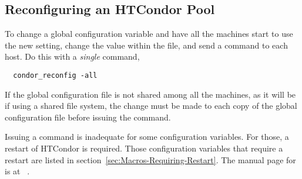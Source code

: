 \subsection{\label{sec:Reconfigure-Pool}Reconfiguring an HTCondor Pool}

To change a global configuration variable and have all the
machines start to use the new setting, change the value within the file,
and send a  command to each host.
Do this with a \emph{single} command,
\begin{verbatim}
  condor_reconfig -all
\end{verbatim}

If the global configuration file is not shared among all the machines,
as it will be if using a shared file system,
the change must be made to each copy of the global configuration file
before issuing the  command.

Issuing a  command is inadequate for some
configuration variables.
For those, a restart of HTCondor is required.
Those configuration variables that require a restart are listed in
section~\ref{sec:Macros-Requiring-Restart}.
The manual page for  is at
~\pageref{man-condor-restart}.


